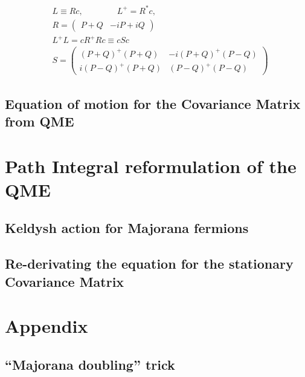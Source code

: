 \documentclass[a4paper,11pt]{article}
\begin{document}
\begin{subequations}
\label{eq:quadr_lindb_majorana}
\begin{align}
    &L    \equiv Rc, \quad \quad \quad \quad  L^+  = R^*c,\\
    &R = \left(\begin{array}{cc} P+Q & -iP+iQ\end{array}\right) \\[0.3cm]
    &L^+L = cR^+Rc \equiv cSc \\
    &S =\left(\begin{array}{cc} (P+Q)^+(P+Q) & -i(P+Q)^+(P-Q)\\i(P-Q)^+(P+Q)&(P-Q)^+(P-Q) \end{array}\right)
\end{align} 
\end{subequations}
  

  
  
  \subsection{Equation of motion for the Covariance Matrix from QME}
 \section{Path Integral reformulation of the QME}
  \subsection{Keldysh action for Majorana fermions}
  \subsection{Re-derivating the equation for the stationary Covariance Matrix}

  \appendix
  \section*{Appendix}
    \renewcommand{\thesection}{A}
    \subsection{``Majorana doubling'' trick}
    \label{sec:majo_doubling_theory}
    
   
   
{}
  
\end{document}

